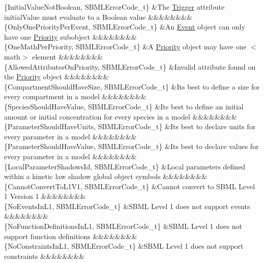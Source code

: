 \begin{DoxyParagraph}{}
\begin{longtabu}
\{Initial\+Value\+Not\+Boolean, S\+B\+M\+L\+Error\+Code\+\_\+t\} &The \hyperlink{class_trigger}{Trigger} attribute \textquotesingle{}initial\+Value\textquotesingle{} must evaluate to a Boolean value &&&&&&&&\\
\{Only\+One\+Priority\+Per\+Event, S\+B\+M\+L\+Error\+Code\+\_\+t\} &An \hyperlink{class_event}{Event} object can only have one \hyperlink{class_priority}{Priority} subobject &&&&&&&&\\
\{One\+Math\+Per\+Priority, S\+B\+M\+L\+Error\+Code\+\_\+t\} &A \hyperlink{class_priority}{Priority} object may have one {\ttfamily $<$math$>$} element &&&&&&&&\\
\{Allowed\+Attributes\+On\+Priority, S\+B\+M\+L\+Error\+Code\+\_\+t\} &Invalid attribute found on the \hyperlink{class_priority}{Priority} object &&&&&&&&\\
\{Compartment\+Should\+Have\+Size, S\+B\+M\+L\+Error\+Code\+\_\+t\} &It\textquotesingle{}s best to define a size for every compartment in a model &&&&&&&&\\
\{Species\+Should\+Have\+Value, S\+B\+M\+L\+Error\+Code\+\_\+t\} &It\textquotesingle{}s best to define an initial amount or initial concentration for every species in a model &&&&&&&&\\
\{Parameter\+Should\+Have\+Units, S\+B\+M\+L\+Error\+Code\+\_\+t\} &It\textquotesingle{}s best to declare units for every parameter in a model &&&&&&&&\\
\{Parameter\+Should\+Have\+Value, S\+B\+M\+L\+Error\+Code\+\_\+t\} &It\textquotesingle{}s best to declare values for every parameter in a model &&&&&&&&\\
\{Local\+Parameter\+Shadows\+Id, S\+B\+M\+L\+Error\+Code\+\_\+t\} &Local parameters defined within a kinetic law shadow global object symbols &&&&&&&&\\
\{Cannot\+Convert\+To\+L1\+V1, S\+B\+M\+L\+Error\+Code\+\_\+t\} &Cannot convert to S\+B\+ML Level 1 Version 1 &&&&&&&&\\
\{No\+Events\+In\+L1, S\+B\+M\+L\+Error\+Code\+\_\+t\} &S\+B\+ML Level 1 does not support events &&&&&&&&\\
\{No\+Function\+Definitions\+In\+L1, S\+B\+M\+L\+Error\+Code\+\_\+t\} &S\+B\+ML Level 1 does not support function definitions &&&&&&&&\\
\{No\+Constraints\+In\+L1, S\+B\+M\+L\+Error\+Code\+\_\+t\} &S\+B\+ML Level 1 does not support constraints &&&&&&&&\\

\end{longtabu}
\end{DoxyParagraph}
